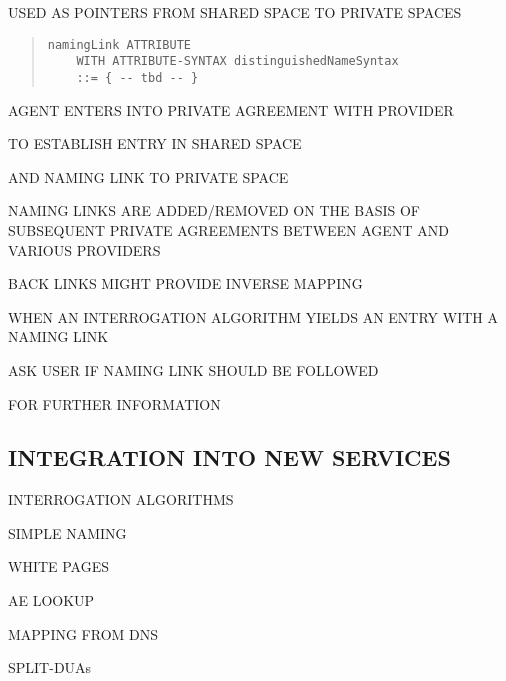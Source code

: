 \begin{bwslide}

\begin{nrtc}
\item	USED AS POINTERS FROM SHARED SPACE TO PRIVATE SPACES
\begin{quote}\begin{verbatim}
namingLink ATTRIBUTE
    WITH ATTRIBUTE-SYNTAX distinguishedNameSyntax
    ::= { -- tbd -- }
\end{verbatim}\end{quote}

\item	AGENT ENTERS INTO PRIVATE AGREEMENT WITH PROVIDER
    \begin{nrtc}
    \item	TO ESTABLISH ENTRY IN SHARED SPACE

    \item	AND NAMING LINK TO PRIVATE SPACE
    \end{nrtc}

\item	NAMING LINKS ARE ADDED/REMOVED ON THE BASIS OF SUBSEQUENT PRIVATE
	AGREEMENTS BETWEEN AGENT AND VARIOUS PROVIDERS

\item	BACK LINKS MIGHT PROVIDE INVERSE MAPPING
\end{nrtc}
\end{bwslide}


\begin{bwslide}

\begin{nrtc}
\item	WHEN AN INTERROGATION ALGORITHM YIELDS AN ENTRY WITH A NAMING LINK
    \begin{nrtc}
    \item	ASK USER IF NAMING LINK SHOULD BE FOLLOWED
    \end{nrtc}
    FOR FURTHER INFORMATION
\end{nrtc}
\end{bwslide}


\begin{bwslide}
\part	{INTEGRATION INTO NEW SERVICES}\bf

\begin{nrtc}
\item	INTERROGATION ALGORITHMS

\item	SIMPLE NAMING

\item	WHITE PAGES

\item	AE LOOKUP

\item	MAPPING FROM DNS

\item	SPLIT-DUAs
\end{nrtc}
\end{bwslide}


